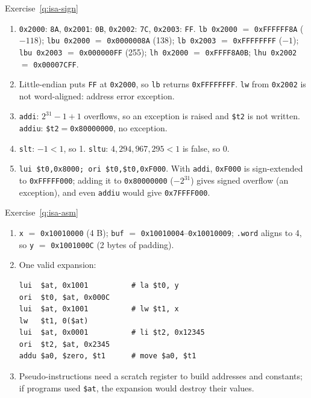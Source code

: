 \begin{noot}{Exercise~\ref{q:isa-sign}}
\begin{enumerate}[label=(\alph*),leftmargin=*]
  \item \texttt{0x2000}: \texttt{8A}, \texttt{0x2001}: \texttt{0B},
  \texttt{0x2002}: \texttt{7C}, \texttt{0x2003}: \texttt{FF}.
  \texttt{lb 0x2000} $=$ \texttt{0xFFFFFF8A} ($-118$);
  \texttt{lbu 0x2000} $=$ \texttt{0x0000008A} (138);
  \texttt{lb 0x2003} $=$ \texttt{0xFFFFFFFF} ($-1$);
  \texttt{lbu 0x2003} $=$ \texttt{0x000000FF} (255);
  \texttt{lh 0x2000} $=$ \texttt{0xFFFF8A0B};
  \texttt{lhu 0x2002} $=$ \texttt{0x00007CFF}.
  \item Little-endian puts \texttt{FF} at \texttt{0x2000}, so \texttt{lb}
  returns \texttt{0xFFFFFFFF}. \texttt{lw} from \texttt{0x2002} is not
  word-aligned: address error exception.
  \item \texttt{addi}: $2^{31}-1+1$ overflows, so an exception is raised and
  \texttt{\$t2} is not written. \texttt{addiu}: \texttt{\$t2}$=$\texttt{0x80000000}, no exception.
  \item \texttt{slt}: $-1<1$, so 1. \texttt{sltu}: $4{,}294{,}967{,}295<1$ is false, so 0.
  \item \texttt{lui \$t0,0x8000; ori \$t0,\$t0,0xF000}. With \texttt{addi},
  \texttt{0xF000} is sign-extended to \texttt{0xFFFFF000}; adding it to
  \texttt{0x80000000} ($-2^{31}$) gives signed overflow (an exception), and even
  \texttt{addiu} would give \texttt{0x7FFFF000}.
\end{enumerate}
\end{noot}

\begin{noot}{Exercise~\ref{q:isa-asm}}
\begin{enumerate}[label=(\alph*),leftmargin=*]
  \item \texttt{x} $=$ \texttt{0x10010000} (4 B); \texttt{buf} $=$
  \texttt{0x10010004}--\texttt{0x10010009}; \texttt{.word} aligns to 4, so
  \texttt{y} $=$ \texttt{0x1001000C} (2 bytes of padding).
  \item One valid expansion:
\begin{lstlisting}
lui  $at, 0x1001          # la $t0, y
ori  $t0, $at, 0x000C
lui  $at, 0x1001          # lw $t1, x
lw   $t1, 0($at)
lui  $at, 0x0001          # li $t2, 0x12345
ori  $t2, $at, 0x2345
addu $a0, $zero, $t1      # move $a0, $t1
\end{lstlisting}
  \item Pseudo-instructions need a scratch register to build addresses and
  constants; if programs used \texttt{\$at}, the expansion would destroy their
  values.
\end{enumerate}
\end{noot}

